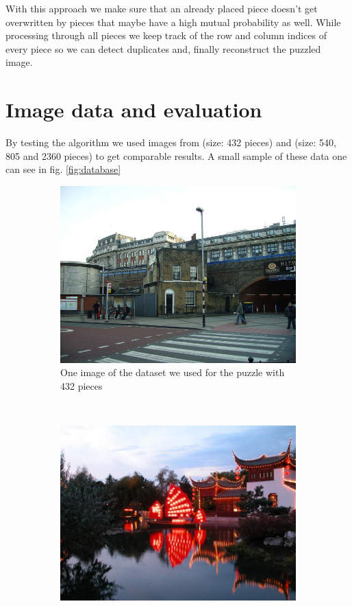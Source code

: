 \documentclass[11pt]{report}
\begin{document}
With this approach we make sure that an already placed piece doesn't get overwritten by pieces that maybe have a high mutual probability as well. While processing through all pieces we keep track of the row and column indices of every piece so we can detect duplicates and, finally reconstruct the puzzled image.
\newpage

\section{Image data and evaluation}
By testing the algorithm we used images from \cite{Cho2010} (size: 432 pieces) and \cite{Pomeranz2011} (size: 540, 805 and 2360 pieces) to get comparable results. A small sample of these data one can see in fig. \ref{fig:database}

\begin{figure}
	\centering
	\begin{subfigure}[b]{0.45\textwidth}
		\includegraphics[width=\textwidth]{../imData/432/1.png}
		\caption{One image of the dataset we used for the puzzle with 432 pieces}
		\label{img:432}
	\end{subfigure}
	~
	\begin{subfigure}[b]{0.45\textwidth}
		\includegraphics[width=\textwidth]{../imData/540/1.jpg}

\end{subfigure}
\end{figure}
\end{document}
